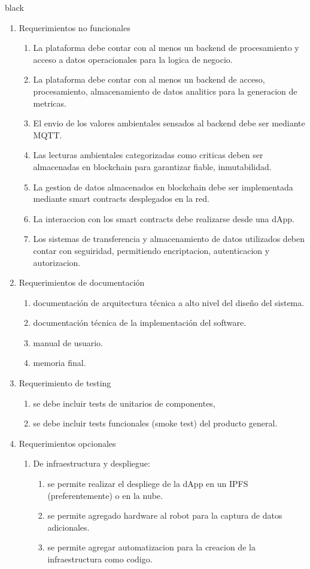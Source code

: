 \documentclass[
11pt, %
]{charter}
\begin{document}
\begin{consigna}{black}
\begin{enumerate}
					
	\item Requerimientos no funcionales		
	\begin{enumerate}	
		\item La plataforma debe contar con al menos un backend de procesamiento y acceso a datos operacionales para la logica de negocio.
		\item La plataforma debe contar con al menos un backend de acceso, procesamiento, almacenamiento de datos analitics para la  generacion de metricas.		
		\item El envio de los valores ambientales sensados al backend debe ser mediante MQTT.
		\item Las lecturas ambientales categorizadas como criticas deben ser almacenadas en blockchain para garantizar fiable, inmutabilidad.
		\item La gestion de datos almacenados en blockchain debe ser implementada mediante smart contracts desplegados en la red.
		\item La interaccion con los smart contracts debe realizarse desde una dApp.
		\item Los sistemas de transferencia y almacenamiento de datos utilizados deben contar con seguiridad, permitiendo encriptacion, autenticacion y autorizacion.	
		\end{enumerate}	
		
	\item Requerimientos de documentación		
		\begin{enumerate}			
			\item documentación de arquitectura técnica a alto nivel del diseño del sistema.			
			\item documentación técnica de la implementación del software.
			\item manual de usuario.	
			\item memoria final.	
		\end{enumerate}	
	\item Requerimiento de testing		
		\begin{enumerate}			
			\item se debe incluir tests de unitarios de componentes,
			\item se debe incluir tests funcionales (smoke test) del producto general.		
		\end{enumerate}	
	
	\item Requerimientos opcionales		
		\begin{enumerate}			
			\item De infraestructura y despliegue: 
				\begin{enumerate}			
					\item se permite realizar el despliege de la dApp en un IPFS (preferentemente) o en la nube.					
					\item se permite agregado hardware al robot para la captura de datos adicionales.
					\item se permite agregar automatizacion para la creacion de la infraestructura como codigo.
				\end{enumerate}			
			

\end{enumerate}
\end{enumerate}
\end{consigna}
\end{document}
